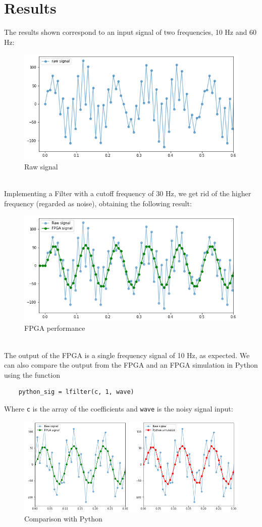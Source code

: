 \documentclass[11pt,a4paper,twocolumn]{IEEEtran}
\begin{document}
	\section{Results}
	The results shown correspond to an input signal of two frequencies, 10 Hz and 60 Hz: 
	\begin{figure}[h]
		\centering
		\includegraphics[width=.9\linewidth]{img/rawsig}
		\caption{Raw signal}
	\end{figure}\\
	Implementing a Filter with a cutoff frequency of 30 Hz, we get rid of the higher frequency (regarded as noise), obtaining the following result:
	\begin{figure}[h]
		\centering
		\includegraphics[width=.9\linewidth]{img/fpgaresult}
		\caption{FPGA performance}
	\end{figure}\\
	The output of the FPGA is a single frequency signal of 10 Hz, as expected. We can also compare the output from the FPGA and an FPGA simulation in Python using the function
	\begin{lstlisting}
	python_sig = lfilter(c, 1, wave)
	\end{lstlisting}
	Where \texttt{c} is the array of the coefficients and \texttt{wave} is the noisy signal input:
	\begin{figure}[h]
		\centering
		\includegraphics[width=1\linewidth]{img/fpgapython}
		\caption{Comparison with Python}
	\end{figure}\\
\end{document}
